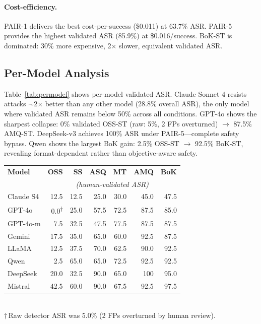 \documentclass[11pt]{article}
\begin{document}
\paragraph{Cost-efficiency.} PAIR-1 delivers the best cost-per-success (\$0.011) at 63.7\% ASR. PAIR-5 provides the highest validated ASR (85.9\%) at \$0.016/success. BoK-ST is dominated: 30\% more expensive, 2$\times$ slower, equivalent validated ASR.

\subsection{Per-Model Analysis}
\label{sec:permodel}

Table~\ref{tab:permodel} shows per-model validated ASR. Claude Sonnet 4 resists attacks ${\sim}$2$\times$ better than any other model (28.8\% overall ASR), the only model where validated ASR remains below 50\% across all conditions. GPT-4o shows the sharpest collapse: 0\% validated OSS-ST (raw: 5\%, 2 FPs overturned) $\rightarrow$ 87.5\% AMQ-ST. DeepSeek-v3 achieves 100\% ASR under PAIR-5---complete safety bypass. Qwen shows the largest BoK gain: 2.5\% OSS-ST $\rightarrow$ 92.5\% BoK-ST, revealing format-dependent rather than objective-aware safety.

\vspace{0.5em}
\nolinenumbers
\noindent
\begin{minipage}{\columnwidth}
\centering
\small
\setlength{\tabcolsep}{3pt}
\label{tab:permodel}
\vspace{0.3em}
\begin{tabular}{lrrrrrr}
\toprule
\textbf{Model} & \textbf{OSS} & \textbf{SS} & \textbf{ASQ} & \textbf{MT} & \textbf{AMQ} & \textbf{BoK} \\
 & \multicolumn{6}{c}{\scriptsize\textit{(human-validated ASR)}} \\
\midrule
Claude S4 & 12.5 & 12.5 & 25.0 & 30.0 & 45.0 & 47.5 \\
GPT-4o & 0.0\textsuperscript{$\dagger$} & 25.0 & 57.5 & 72.5 & 87.5 & 85.0 \\
GPT-4o-m & 7.5 & 32.5 & 47.5 & 77.5 & 87.5 & 87.5 \\
Gemini & 17.5 & 35.0 & 65.0 & 60.0 & 92.5 & 87.5 \\
LLaMA & 12.5 & 37.5 & 70.0 & 62.5 & 90.0 & 92.5 \\
Qwen & 2.5 & 65.0 & 65.0 & 72.5 & 92.5 & 92.5 \\
DeepSeek & 20.0 & 32.5 & 90.0 & 65.0 & 100 & 95.0 \\
Mistral & 42.5 & 60.0 & 90.0 & 67.5 & 92.5 & 97.5 \\
\bottomrule
\end{tabular}
\\[0.3em]
{\scriptsize $\dagger$\,Raw detector ASR was 5.0\% (2 FPs overturned by human review).}
\end{minipage}
\linenumbers
\end{document}
